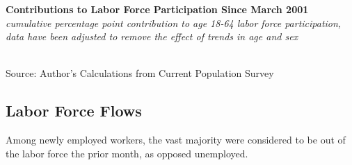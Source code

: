 \documentclass{report}
\makeatletter
\newcommand{\tbllink}[1]{\href{https://raw.githubusercontent.com/bdecon/US-chartbook/master/chartbook/data/#1}{\faTable}}
\newcommand*\short[1]{\expandafter\@gobbletwo\number\numexpr#1\relax}
\newcommand{\stdnode}[3]{\node[below, align=left, shift=({#1,#2})]{#3};}
\newcommand{\dateaxisticks}{
		date coordinates in=x, axis line style={draw=none},
		xmax={2020-02-01},
		max space between ticks=40,	    
		xtick={{1990-01-01}, {1992-01-01}, {1994-01-01}, 
			{1996-01-01}, {1998-01-01}, {2000-01-01}, 
			{2002-01-01}, {2004-01-01}, {2006-01-01},
			{2008-01-01}, {2010-01-01}, {2012-01-01}, {2014-01-01},
		    {2016-01-01}, {2018-01-01}, {2020-01-01}},
		minor xtick={{1989-01-01}, {1991-01-01}, {1993-01-01},
			{1995-01-01}, {1997-01-01}, {1999-01-01}, 
			{2001-01-01}, {2003-01-01}, {2005-01-01}, {2007-01-01},
		    {2009-01-01}, {2011-01-01}, {2013-01-01}, {2015-01-01},
		    {2017-01-01}, {2019-01-01}},
		enlarge y limits={0.06}, enlarge x limits={0.01},
		}
\newcommand{\bbar}[2]{extra #1 ticks = {{#2}}, extra #1 tick labels = ,
		extra #1 tick style = {grid=major, grid style={thick, black!25}},}
\newcommand{\thickline}[4]{\addplot[ultra thick, no markers, color=#1] 
		table [x=#2, y=#3, col sep=comma] {#4};	}
\newcommand{\rebars}{
		\fill[color=black!10] (axis cs:{2007-12-01},\pgfkeysvalueof{/pgfplots/ymin}) rectangle 
			(axis cs:{2009-07-01}, \pgfkeysvalueof{/pgfplots/ymax});
		\fill[color=black!10] (axis cs:{2001-03-01},\pgfkeysvalueof{/pgfplots/ymin}) rectangle 
			(axis cs:{2001-11-01}, \pgfkeysvalueof{/pgfplots/ymax});}
\makeatother
\begin{document}
{{{{\begin{minipage}{0.76\textwidth}
\vspace{2mm}

\noindent \normalsize \textbf{Contributions to Labor Force Participation Since March 2001}\\
\footnotesize{\textit{cumulative percentage point contribution to age 18-64 labor force participation,\\data have been adjusted to remove the effect of trends in age and sex}}\\ 
\noindent \hspace*{-2mm} \\
\footnotesize{Source: Author's Calculations from Current Population Survey} \hspace{16mm} \tbllink{nilf.csv}

\end{minipage}

\newpage


\begin{minipage}{0.76\textwidth}

\subsection*{\color{black!70} \seriffont Labor Force Flows}

\vspace{2mm}

\small Among newly employed workers, the vast majority were considered to be out of the labor force the prior month, as opposed unemployed.  \\


\end{minipage}}}}}
\end{document}
